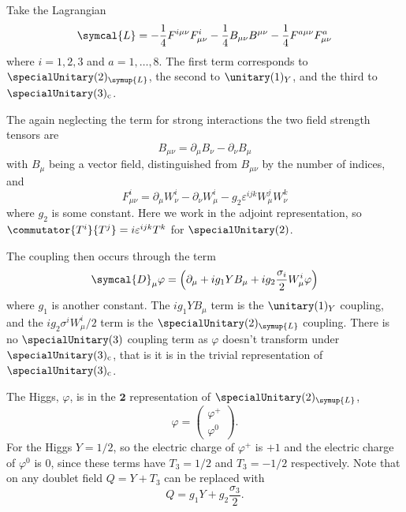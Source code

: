 \documentclass[fleqn]{NotesClass}
\newcommand{\Left}{\symup{L}}
\newcommand{\lagrangianDensity}{\symcal{L}}
\newcommand{\rep}[1]{\symbf{#1}}
\newcommand{\covariantDerivative}{\symcal{D}}
\begin{document}
    Take the Lagrangian
    \begin{equation}
        \lagrangianDensity = -\frac{1}{4} F^{i\mu\nu} F^i_{\mu\nu} - \frac{1}{4}B_{\mu\nu}B^{\mu\nu} - \frac{1}{4}F^{a\mu\nu}F^a_{\mu\nu}
    \end{equation}
    where \(i = 1, 2, 3\) and \(a = 1, \dotsc, 8\).
    The first term corresponds to \(\specialUnitary(2)_{\Left}\), the second to \(\unitary(1)_Y\), and the third to \(\specialUnitary(3)_{\mathrm{c}}\).
    
    The again neglecting the term for strong interactions the two field strength tensors are
    \begin{equation}
        B_{\mu\nu} = \partial_\mu B_\nu - \partial_\nu B_\mu
    \end{equation}
    with \(B_\mu\) being a vector field, distinguished from \(B_{\mu\nu}\) by the number of indices, and
    \begin{equation}
        F^i_{\mu\nu} = \partial_\mu W^i_\nu - \partial_\nu W^i_\mu - g_2 \varepsilon^{ijk} W^j_\mu W_\nu^k
    \end{equation}
    where \(g_2\) is some constant.
    Here we work in the adjoint representation, so \(\commutator{T^i}{T^j} = i\varepsilon^{ijk} T^k\) for \(\specialUnitary(2)\).
    
    The coupling then occurs through the term
    \begin{equation}
        \covariantDerivative_\mu \varphi = \left( \partial_\mu + ig_1 Y B_\mu + ig_2 \frac{\sigma_i}{2} W^i_\mu  \varphi \right)
    \end{equation}
    where \(g_1\) is another constant.
    The \(ig_1 YB_\mu\) term is the \(\unitary(1)_Y\) coupling, and the \(ig_2\sigma^i W^i_\mu/2\) term is the \(\specialUnitary(2)_{\Left}\) coupling.
    There is no \(\specialUnitary(3)\) coupling term as \(\varphi\) doesn't transform under \(\specialUnitary(3)_{\mathrm{c}}\), that is it is in the trivial representation of \(\specialUnitary(3)_{\mathrm{c}}\).
    
    The Higgs, \(\varphi\), is in the \(\rep{2}\) representation of \(\specialUnitary(2)_{\Left}\),
    \begin{equation}
        \varphi = 
        \begin{pmatrix}
            \varphi^+\\ \varphi^0
        \end{pmatrix}
        .
    \end{equation}
    For the Higgs \(Y = 1/2\), so the electric charge of \(\varphi^+\) is \(+1\) and the electric charge of \(\varphi^0\) is 0, since these terms have \(T_3 = 1/2\) and \(T_3 = -1/2\) respectively.
    Note that on any doublet field \(Q = Y + T_3\) can be replaced with
    \begin{equation}
        Q = g_1 Y + g_2 \frac{\sigma_3}{2}.
    \end{equation}
    
\end{document}

